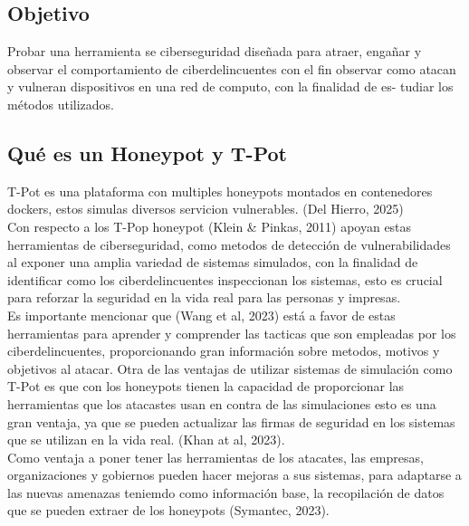 \subsection{Objetivo}
Probar una herramienta se ciberseguridad diseñada para atraer, engañar y observar el comportamiento de ciberdelincuentes con el fin observar como atacan y vulneran dispositivos en una red de computo, con la finalidad de es- tudiar los métodos utilizados.
\subsection{Qué es un Honeypot y T-Pot}
T-Pot es una plataforma con multiples honeypots montados en contenedores dockers, estos simulas diversos servicion vulnerables. (Del Hierro, 2025)\\
Con respecto a los T-Pop honeypot (Klein \& Pinkas, 2011) apoyan estas herramientas de ciberseguridad, como metodos de detección de vulnerabilidades al exponer una amplia variedad de sistemas simulados, con la finalidad de identificar como los ciberdelincuentes inspeccionan los sistemas, esto es crucial para reforzar la seguridad en la vida real para las personas y impresas.\\
Es importante mencionar que (Wang et al, 2023) está a favor de estas herramientas para aprender y comprender las tacticas que son empleadas por los ciberdelincuentes, proporcionando gran información sobre metodos, motivos y objetivos al atacar.
Otra de las ventajas de utilizar sistemas de simulación como T-Pot es que con los honeypots tienen la capacidad de proporcionar las herramientas que los atacastes usan en contra de las simulaciones esto es una gran ventaja, ya que se pueden actualizar las firmas de seguridad en los sistemas que se utilizan en la vida real. (Khan at al, 2023).\\
Como ventaja a poner tener las herramientas de los atacates, las empresas, organizaciones y gobiernos pueden hacer mejoras a sus sistemas, para adaptarse a las nuevas amenazas teniemdo como información base, la recopilación de datos que se pueden extraer de los honeypots (Symantec, 2023).
